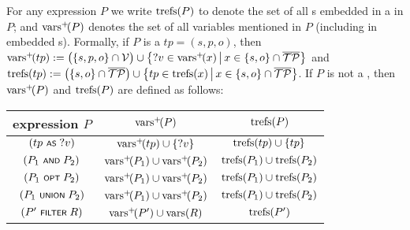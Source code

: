 \noindent
For any {\SPARQLplus} expression $P$ we write $\mathrm{trefs}(P)$ to denote the set of all {\TPplus}s embedded in a {\TPplus} in $P$; and $\mathrm{vars}^+\!(P)$ denotes the set of all variables mentioned in $P$ (including in embedded {\TPplus}s). Formally, if $P$ is a {\TPplus} $tp \!=\! (s,p,o)$,
then $\mathrm{vars}^+\!(tp) := \bigl( \lbrace s,p,o \rbrace \cap \mathcal{V} \bigr) \cup \big\lbrace ?v \in \mathrm{vars}^+\!(x) \,\big|\, x \in \lbrace s,o \rbrace \cap \overline{\mathcal{TP}} \big\rbrace$
and $\mathrm{trefs}(tp) := \bigl( \lbrace s,o \rbrace \cap \overline{\mathcal{TP}} \bigr) \cup \big\lbrace tp \in \mathrm{trefs}(x) \,\big|\, x \in \lbrace s,o \rbrace \cap \overline{\mathcal{TP}} \big\rbrace$.
If $P$ is not a {\TPplus}, then $\mathrm{vars}^+\!(P)$ and $\mathrm{trefs}(P)$ are defined as follows:
	\par \vspace{1pt}
	\parbox{0.95\linewidth}{\centering
		\begin{tabular}{|c||c|c|} \hline
			{\SPARQLplus} expression $P$ &
			$\mathrm{vars}^+\!(P)$ &
			$\mathrm{trefs}(P)$
			\\ \hline
			\hline
			$(tp \text{ \normalfont\scriptsize\textsf{AS} } ?v)$ &
			$\mathrm{vars}^+\!(tp) \cup \lbrace ?v \rbrace$ &
			$\mathrm{trefs}(tp) \cup \lbrace tp \rbrace$
			\\ \hline
			$(P_1 \text{ \normalfont\scriptsize\textsf{AND} } P_2)$ &
			$\mathrm{vars}^+\!(P_1) \cup \mathrm{vars}^+\!(P_2)$ &
			$\mathrm{trefs}(P_1) \cup \mathrm{trefs}(P_2)$
			\\ \hline
			$(P_1 \text{ \normalfont\scriptsize\textsf{OPT} } P_2)$ &
			$\mathrm{vars}^+\!(P_1) \cup \mathrm{vars}^+\!(P_2)$ &
			$\mathrm{trefs}(P_1) \cup \mathrm{trefs}(P_2)$
			\\ \hline
			$(P_1 \text{ \normalfont\scriptsize\textsf{UNION} } P_2)$ &
			$\mathrm{vars}^+\!(P_1) \cup \mathrm{vars}^+\!(P_2)$ &
			$\mathrm{trefs}(P_1) \cup \mathrm{trefs}(P_2)$
			\\ \hline
			$(P' \text{ \normalfont\scriptsize\textsf{FILTER} } R)$ &
			$\mathrm{vars}^+\!(P') \cup \mathrm{vars}(R)$ &
			$\mathrm{trefs}(P')$
			\\ \hline
		\end{tabular}
	}
	\par

